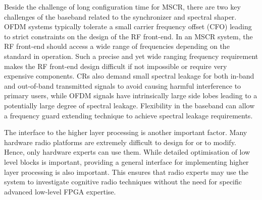 Beside the challenge of long configuration time for MSCR, there are two key challenges of the baseband related to the synchronizer and spectral shaper. OFDM systems typically tolerate a small carrier frequency offset (CFO) leading to strict constraints on the design of the RF front-end. In an MSCR system, the RF front-end should access a wide range of frequencies depending on the standard in operation. Such a precise and yet wide ranging frequency requirement makes the RF front-end design difficult if not impossible or require very expensive components.
CRs also demand small spectral leakage for both in-band and out-of-band transmitted signals to avoid causing harmful interference to primary users, while OFDM signals have intrinsically large side lobes leading to a potentially large degree of spectral leakage.
Flexibility in the baseband can allow a frequency guard extending technique to achieve spectral leakage requirements.

The interface to the higher layer processing is another important factor. Many hardware radio platforms are extremely difficult to design for or to modify. Hence, only hardware experts can use them. While detailed optimisation of low level blocks is important, providing a general interface for implementing higher layer processing is also important. This ensures that radio experts may use the system to investigate cognitive radio techniques without the need for specific advanced low-level FPGA expertise.

